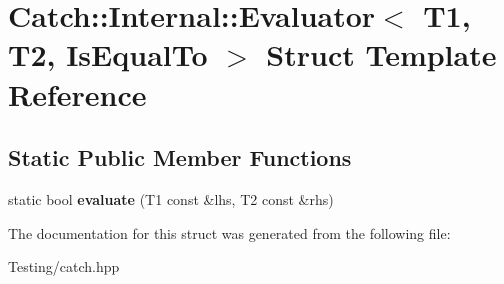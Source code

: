 \hypertarget{struct_catch_1_1_internal_1_1_evaluator_3_01_t1_00_01_t2_00_01_is_equal_to_01_4}{\section{Catch\-:\-:Internal\-:\-:Evaluator$<$ T1, T2, Is\-Equal\-To $>$ Struct Template Reference}
\label{struct_catch_1_1_internal_1_1_evaluator_3_01_t1_00_01_t2_00_01_is_equal_to_01_4}
}
\subsection*{Static Public Member Functions}
\begin{DoxyCompactItemize}
\item 
\hypertarget{struct_catch_1_1_internal_1_1_evaluator_3_01_t1_00_01_t2_00_01_is_equal_to_01_4_a166b2b7849247397e63fb2940481b217}{static bool {\bfseries evaluate} (T1 const \&lhs, T2 const \&rhs)}\label{struct_catch_1_1_internal_1_1_evaluator_3_01_t1_00_01_t2_00_01_is_equal_to_01_4_a166b2b7849247397e63fb2940481b217}

\end{DoxyCompactItemize}


The documentation for this struct was generated from the following file\-:\begin{DoxyCompactItemize}
\item 
Testing/catch.\-hpp\end{DoxyCompactItemize}
